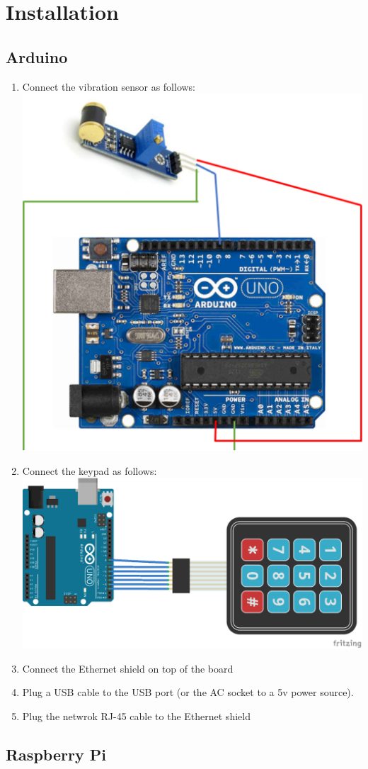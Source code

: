 \documentclass[10pt]{article}
\begin{document}
\section{Installation}
\subsection{Arduino}
\begin{enumerate}
	\item Connect the vibration sensor as follows:\\
	\includegraphics[scale=0.3]{ard2.eps}
	\item Connect the keypad as follows:\\
	\includegraphics[scale=0.65]{ard1.eps}
	\item Connect the Ethernet shield on top of the board
	\item Plug a USB cable to the USB port (or the AC socket to a 5v power source).	
	\item Plug the netwrok RJ-45 cable to the Ethernet shield
\end{enumerate}
\subsection{Raspberry Pi}
\end{document}
